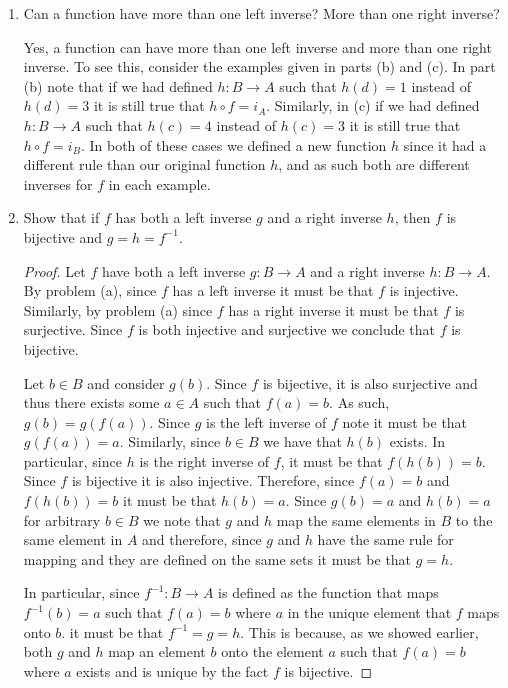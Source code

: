 \documentclass[12pt]{article}
\begin{document}
\begin{enumerate}[label=(\alph*)]
	\item Can a function have more than one left inverse? More than one right inverse?
	
	Yes, a function can have more than one left inverse and more than one right inverse.
	To see this, consider the examples given in parts (b) and (c). In part (b) note that
	if we had defined $h: B \to A$ such that $h(d) = 1$ instead of $h(d) = 3$ it is 
	still true that $h \circ f = i_A$.
	Similarly, in (c) if we had defined $h: B \to A$ such that $h(c) = 4$ instead of 
	$h(c) = 3$ it is still true that $h \circ f = i_B$. In both of these cases
	we defined a new function $h$ since it had a different rule than our original
	function $h$, and as such both are different inverses for $f$ in each example.
	
	\item Show that if $f$ has both a left inverse $g$ and a right inverse $h$, then
	$f$ is bijective and $g = h = f^{-1}$.
	\begin{proof}
		Let $f$ have both a left inverse $g: B \to A$ and a right inverse $h: B \to A$.
		By problem (a), since $f$ has a left inverse it must be that $f$ is injective.
		Similarly, by problem (a) since $f$ has a right inverse it must be that $f$ is surjective.
		Since $f$ is both injective and surjective we conclude that $f$ is bijective. 
		
		Let $b \in B$ and consider $g(b)$. Since $f$ is bijective, it is also surjective and thus 
		there exists some $a \in A$ such that $f(a) = b$. As such, $g(b) = g(f(a))$. Since $g$ is 
		the left inverse of $f$ note it must be that $g(f(a)) = a$. Similarly, since $b \in B$ we have 
		that $h(b)$ exists. In particular, since $h$ is the right inverse of $f$, it must be that 
		$f(h(b)) = b$. Since $f$ is bijective it is also injective. Therefore, since 
		$f(a) = b$ and $f(h(b)) = b$ it must be that $h(b) = a$. Since $g(b) = a$ and 
		$h(b) = a$ for arbitrary $b \in B$ we note that $g$ and $h$ map the same elements in $B$
		to the same element in $A$ and therefore, since $g$ and $h$ have the same rule for
		mapping and they are defined on the same sets it must be that $g = h$.
		
		In particular, since $f^{-1}: B \to A$ is defined as the function that maps $f^{-1}(b) = a$
		such that $f(a) = b$ where $a$ in the unique element that $f$ maps onto $b$. it must
		be that $f^{-1} = g = h$. This is because, as we showed earlier, both $g$ and $h$ map
		an element $b$ onto the element $a$ such that $f(a) = b$ where $a$ exists and is 
		unique by the fact $f$ is bijective.   
	\end{proof}
\end{enumerate}
\end{document}
